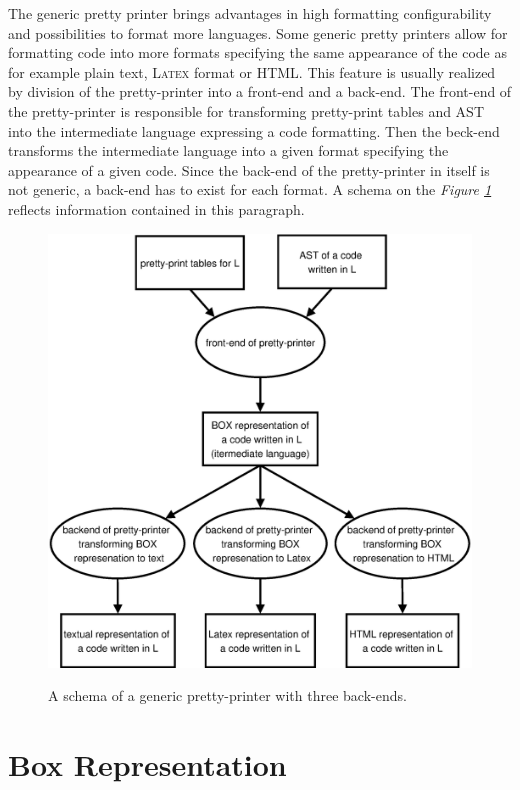\documentclass[12pt,notitlepage,a4paper]{report}
\begin{document}
The generic pretty printer brings advantages in high formatting configurability and possibilities to format more languages. Some generic pretty printers allow for formatting code into more formats specifying the same appearance of the code as for example plain text, \textsc{Latex} format or HTML. This feature is usually realized by division of the pretty-printer into a front-end and a back-end. The front-end of the pretty-printer is responsible for transforming pretty-print tables and AST into the intermediate language expressing a code formatting. Then the beck-end transforms the intermediate language into a given format specifying the appearance of a given code. Since the back-end of the pretty-printer in itself is not generic, a back-end has to exist for each format. A schema on the \textit{Figure \ref{GenericPrinterPrinciple}} reflects  information contained in this paragraph.

\begin{figure}[h!]
\centering
\caption{A schema of a generic pretty-printer with three back-ends.}
\includegraphics[scale=0.51]{pictures/GenericPrettyPrinter.eps}
\label{GenericPrinterPrinciple}
\end{figure}
\noindent
\section {Box Representation}
\end{document}
